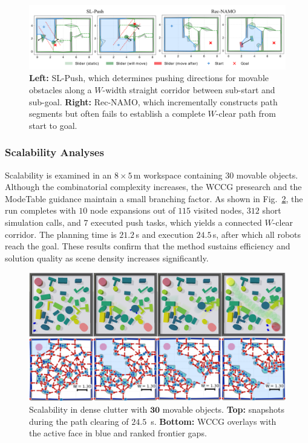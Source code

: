 \begin{figure}[t!]
  \centering
  \includegraphics[width=1.0\columnwidth]{figures/Rec_NAMO.pdf}
  \vspace{-0.15in}
  \caption{\textbf{Left:} SL-Push, which determines pushing directions for movable obstacles along a $W$-width straight corridor between sub-start and sub-goal. \textbf{Right:} Rec-NAMO, which incrementally constructs path segments but often fails to establish a complete $W$-clear path from start to goal.}
  \vspace{-0.2in}
  \label{fig:baseline}
\end{figure}


\subsubsection{Scalability Analyses}\label{subsec:scalability}
Scalability is examined in an $8{\times}5$\,m workspace containing $30$ movable objects. Although
the combinatorial complexity increases, the WCCG presearch and the ModeTable guidance maintain a
small branching factor. As shown in Fig.~\ref{fig:scalability}, the run completes with $10$ node
expansions out of $115$ visited nodes, $312$ short simulation calls, and $7$ executed push tasks,
which yields a connected $W$-clear corridor. The planning time is $21.2$\,s and execution
$24.5$\,s, after which all robots reach the goal. These results confirm that the method sustains
efficiency and solution quality as scene density increases significantly.
\begin{figure}[t!]
  \centering
  \includegraphics[width=0.95\linewidth]{figures/scalability.png}
  \vspace{-0.1in}
 \caption{Scalability in dense clutter with $\boldsymbol{30}$ movable objects.
\textbf{Top:} snapshots during the path clearing of $24.5$~s.
\textbf{Bottom:} WCCG overlays with the active face in blue and ranked frontier gaps.}
\label{fig:scalability}
\vspace{-0.2in}
\end{figure}


